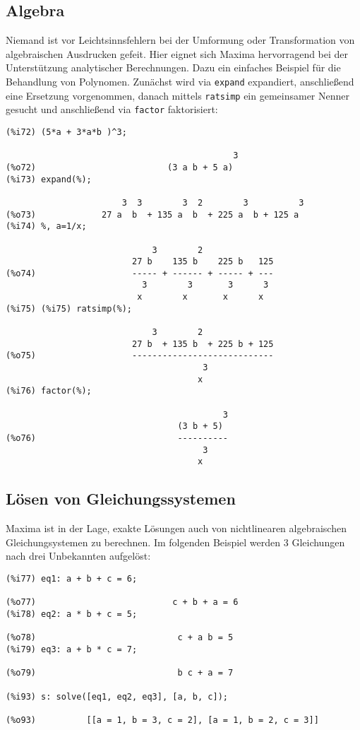 \documentclass[12pt]{scrartcl}
\begin{document}
\subsection{Algebra}

Niemand ist vor Leichtsinnsfehlern bei der Umformung oder
Transformation von algebraischen Ausdrucken gefeit. Hier eignet sich
Maxima hervorragend  bei der Unterstützung analytischer Berechnungen.
Dazu ein einfaches Beispiel für die Behandlung von Polynomen. Zunächst
wird via \texttt{expand} expandiert, anschließend eine Ersetzung vorgenommen,
danach mittels \texttt{ratsimp} ein gemeinsamer Nenner gesucht und
anschließend via \texttt{factor} faktorisiert:

\begin{verbatim}
(%i72) (5*a + 3*a*b )^3;

                                             3
(%o72)                          (3 a b + 5 a)
(%i73) expand(%);

                       3  3        3  2        3          3
(%o73)             27 a  b  + 135 a  b  + 225 a  b + 125 a
(%i74) %, a=1/x;

                             3        2
                         27 b    135 b    225 b   125
(%o74)                   ----- + ------ + ----- + ---
                           3        3       3      3
                          x        x       x      x
(%i75) (%i75) ratsimp(%);

                             3        2
                         27 b  + 135 b  + 225 b + 125
(%o75)                   ----------------------------
                                       3
                                      x
(%i76) factor(%);

                                           3
                                  (3 b + 5)
(%o76)                            ----------
                                       3
                                      x
\end{verbatim}

\subsection{Lösen von Gleichungssystemen}

Maxima ist in der Lage, exakte Lösungen auch von nichtlinearen
algebraischen  Gleichungsystemen zu berechnen. Im folgenden Beispiel
werden 3  Gleichungen nach drei Unbekannten aufgelöst:

\begin{verbatim}
(%i77) eq1: a + b + c = 6;

(%o77)                           c + b + a = 6
(%i78) eq2: a * b + c = 5;

(%o78)                            c + a b = 5
(%i79) eq3: a + b * c = 7;

(%o79)                            b c + a = 7

(%i93) s: solve([eq1, eq2, eq3], [a, b, c]);

(%o93)          [[a = 1, b = 3, c = 2], [a = 1, b = 2, c = 3]]
\end{verbatim}
\end{document}

